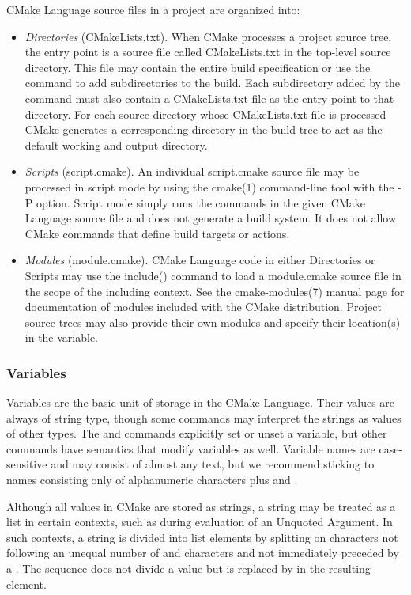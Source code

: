 CMake Language source files in a project are organized into:
\begin{itemize}
    \item \emph{Directories} (CMakeLists.txt). When CMake processes a project source tree, the entry point is a source file called CMakeLists.txt in the top-level source directory. This file may contain the entire build specification or use the  command to add subdirectories to the build. Each subdirectory added by the command must also contain a CMakeLists.txt file as the entry point to that directory. For each source directory whose CMakeLists.txt file is processed CMake generates a corresponding directory in the build tree to act as the default working and output directory.
    \item \emph{Scripts} (script.cmake). An individual script.cmake source file may be processed in script mode by using the cmake(1) command-line tool with the -P option. Script mode simply runs the commands in the given CMake Language source file and does not generate a build system. It does not allow CMake commands that define build targets or actions.
    \item \emph{Modules} (module.cmake). CMake Language code in either Directories or Scripts may use the include() command to load a module.cmake source file in the scope of the including context. See the cmake-modules(7) manual page for documentation of modules included with the CMake distribution. Project source trees may also provide their own modules and specify their location(s) in the  variable.
\end{itemize}

\subsubsection{Variables}
Variables are the basic unit of storage in the CMake Language. Their values are always of string type, though some commands may interpret the strings as values of other types. The  and  commands explicitly set or unset a variable, but other commands have semantics that modify variables as well. Variable names are case-sensitive and may consist of almost any text, but we recommend sticking to names consisting only of alphanumeric characters plus \inlinecode{_} and \inlinecode{-}.

Although all values in CMake are stored as strings, a string may be treated as a list in certain contexts, such as during evaluation of an Unquoted Argument. In such contexts, a string is divided into list elements by splitting on \inlinecode{;} characters not following an unequal number of \inlinecode{[} and \inlinecode{]} characters and not immediately preceded by a \inlinecode{\\}. The sequence \inlinecode{\\;} does not divide a value but is replaced by \inlinecode{;} in the resulting element.

